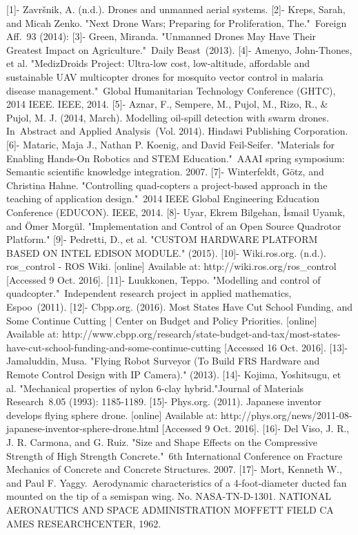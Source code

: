 \documentclass[12pt]{article}
\begin{document}
[1]- Završnik, A. (n.d.). Drones and unmanned aerial systems. 
[2]- Kreps, Sarah, and Micah Zenko. "Next Drone Wars; Preparing for Proliferation, The." Foreign Aff. 93 (2014): 
[3]- Green, Miranda. "Unmanned Drones May Have Their Greatest Impact on Agriculture." Daily Beast (2013).
[4]- Amenyo, John-Thones, et al. "MedizDroids Project: Ultra-low cost, low-altitude, affordable and sustainable UAV multicopter drones for mosquito vector control in malaria disease management." Global Humanitarian Technology Conference (GHTC), 2014 IEEE. IEEE, 2014.
[5]- Aznar, F., Sempere, M., Pujol, M., Rizo, R., & Pujol, M. J. (2014, March). Modelling oil-spill detection with swarm drones. In Abstract and Applied Analysis (Vol. 2014). Hindawi Publishing Corporation.
[6]- Mataric, Maja J., Nathan P. Koenig, and David Feil-Seifer. "Materials for Enabling Hands-On Robotics and STEM Education." AAAI spring symposium: Semantic scientific knowledge integration. 2007.
[7]- Winterfeldt, Götz, and Christina Hahne. "Controlling quad-copters a project-based approach in the teaching of application design." 2014 IEEE Global Engineering Education Conference (EDUCON). IEEE, 2014.
[8]- Uyar, Ekrem Bilgehan, İsmail Uyanık, and Ömer Morgül. "Implementation and Control of an Open Source Quadrotor Platform."
[9]- Pedretti, D., et al. "CUSTOM HARDWARE PLATFORM BASED ON INTEL EDISON MODULE." (2015).
[10]- Wiki.ros.org. (n.d.). ros_control - ROS Wiki. [online] Available at: http://wiki.ros.org/ros_control [Accessed 9 Oct. 2016].
[11]- Luukkonen, Teppo. "Modelling and control of quadcopter." Independent research project in applied mathematics, Espoo (2011).
[12]- Cbpp.org. (2016). Most States Have Cut School Funding, and Some Continue Cutting | Center on Budget and Policy Priorities. [online] Available at: http://www.cbpp.org/research/state-budget-and-tax/most-states-have-cut-school-funding-and-some-continue-cutting [Accessed 16 Oct. 2016].
[13]- Jamaluddin, Musa. "Flying Robot Surveyor (To Build FRS Hardware and Remote Control Design with IP Camera)." (2013).
[14]- Kojima, Yoshitsugu, et al. "Mechanical properties of nylon 6-clay hybrid."Journal of Materials Research 8.05 (1993): 1185-1189.
[15]- Phys.org. (2011). Japanese inventor develops flying sphere drone. [online] Available at: http://phys.org/news/2011-08-japanese-inventor-sphere-drone.html [Accessed 9 Oct. 2016].
[16]- Del Viso, J. R., J. R. Carmona, and G. Ruiz. "Size and Shape Effects on the Compressive Strength of High Strength Concrete." 6th International Conference on Fracture Mechanics of Concrete and Concrete Structures. 2007.
[17]- Mort, Kenneth W., and Paul F. Yaggy. Aerodynamic characteristics of a 4-foot-diameter ducted fan mounted on the tip of a semispan wing. No. NASA-TN-D-1301. NATIONAL AERONAUTICS AND SPACE ADMINISTRATION MOFFETT FIELD CA AMES RESEARCHCENTER, 1962.
\end{document}
